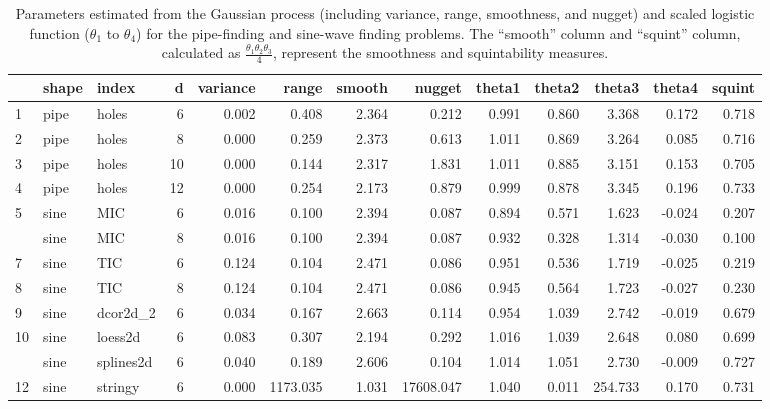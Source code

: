 \documentclass[
  number,
  preprint,
  3p]{elsarticle}
\begin{document}
\begin{longtable}[t]{|>{}ll>{}l|rrr>{}r|rrrr>{}r|>{}r|}

\caption{\label{tbl-smoothness-squintability}Parameters estimated from
the Gaussian process (including variance, range, smoothness, and nugget)
and scaled logistic function (\(\theta_1\) to \(\theta_4\)) for the
pipe-finding and sine-wave finding problems. The ``smooth'' column and
``squint'' column, calculated as
\(\frac{\theta_1 \theta_2 \theta_3}{4}\), represent the smoothness and
squintability measures.}

\tabularnewline

\toprule
 & shape & index & d & variance & range & smooth & nugget & theta1 & theta2 & theta3 & theta4 & squint\\
\midrule
1 & pipe & holes & 6 & 0.002 & 0.408 & 2.364 & 0.212 & 0.991 & 0.860 & 3.368 & 0.172 & 0.718\\
2 & pipe & holes & 8 & 0.000 & 0.259 & 2.373 & 0.613 & 1.011 & 0.869 & 3.264 & 0.085 & 0.716\\
3 & pipe & holes & 10 & 0.000 & 0.144 & 2.317 & 1.831 & 1.011 & 0.885 & 3.151 & 0.153 & 0.705\\
4 & pipe & holes & 12 & 0.000 & 0.254 & 2.173 & 0.879 & 0.999 & 0.878 & 3.345 & 0.196 & 0.733\\
5 & sine & MIC & 6 & 0.016 & 0.100 & 2.394 & 0.087 & 0.894 & 0.571 & 1.623 & -0.024 & 0.207\\
\addlinespace
6 & sine & MIC & 8 & 0.016 & 0.100 & 2.394 & 0.087 & 0.932 & 0.328 & 1.314 & -0.030 & 0.100\\
7 & sine & TIC & 6 & 0.124 & 0.104 & 2.471 & 0.086 & 0.951 & 0.536 & 1.719 & -0.025 & 0.219\\
8 & sine & TIC & 8 & 0.124 & 0.104 & 2.471 & 0.086 & 0.945 & 0.564 & 1.723 & -0.027 & 0.230\\
9 & sine & dcor2d\_2 & 6 & 0.034 & 0.167 & 2.663 & 0.114 & 0.954 & 1.039 & 2.742 & -0.019 & 0.679\\
10 & sine & loess2d & 6 & 0.083 & 0.307 & 2.194 & 0.292 & 1.016 & 1.039 & 2.648 & 0.080 & 0.699\\
\addlinespace
11 & sine & splines2d & 6 & 0.040 & 0.189 & 2.606 & 0.104 & 1.014 & 1.051 & 2.730 & -0.009 & 0.727\\
12 & sine & stringy & 6 & 0.000 & 1173.035 & 1.031 & 17608.047 & 1.040 & 0.011 & 254.733 & 0.170 & 0.731\\
\bottomrule

\end{longtable}
\end{document}
